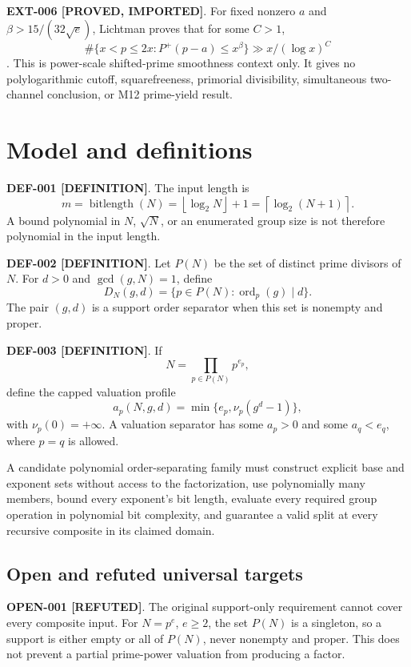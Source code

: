 \documentclass[11pt]{article}
\newcommand{\claimstatus}[2]{\textbf{#1 [#2]}}
\begin{document}
\claimstatus{EXT-006}{PROVED, IMPORTED}. For fixed nonzero \(a\) and
\(\beta>15/(32\sqrt e)\), Lichtman proves that for some \(C>1\),
\[
\#\{x<p\le2x:P^+(p-a)\le x^\beta\}\gg x/(\log x)^C
\]
\cite{lichtman2022shifted}. This is power-scale shifted-prime smoothness
context only. It gives no polylogarithmic cutoff, squarefreeness, primorial
divisibility, simultaneous two-channel conclusion, or M12 prime-yield result.

\section{Model and definitions}

\claimstatus{DEF-001}{DEFINITION}. The input length is
\[
m=\operatorname{bitlength}(N)
=\left\lfloor\log_2N\right\rfloor+1
=\left\lceil\log_2(N+1)\right\rceil.
\]
A bound polynomial in \(N\), \(\sqrt N\), or an enumerated group size is not
therefore polynomial in the input length.

\claimstatus{DEF-002}{DEFINITION}. Let \(P(N)\) be the set of distinct prime
divisors of \(N\). For \(d>0\) and \(\gcd(g,N)=1\), define
\[
D_N(g,d)=
\{p\in P(N):\operatorname{ord}_p(g)\mid d\}.
\]
The pair \((g,d)\) is a support order separator when this set is nonempty and
proper.

\claimstatus{DEF-003}{DEFINITION}. If
\[
N=\prod_{p\in P(N)}p^{e_p},
\]
define the capped valuation profile
\[
a_p(N,g,d)=\min\{e_p,\nu_p(g^d-1)\},
\]
with \(\nu_p(0)=+\infty\). A valuation separator has some \(a_p>0\) and some
\(a_q<e_q\), where \(p=q\) is allowed.

A candidate polynomial order-separating family must construct explicit base
and exponent sets without access to the factorization, use polynomially many
members, bound every exponent's bit length, evaluate every required group
operation in polynomial bit complexity, and guarantee a valid split at every
recursive composite in its claimed domain.

\subsection{Open and refuted universal targets}

\claimstatus{OPEN-001}{REFUTED}. The original support-only requirement cannot
cover every composite input. For \(N=p^e\), \(e\ge2\), the set \(P(N)\) is a
singleton, so a support is either empty or all of \(P(N)\), never nonempty and
proper. This does not prevent a partial prime-power valuation from producing a
factor.
\end{document}
